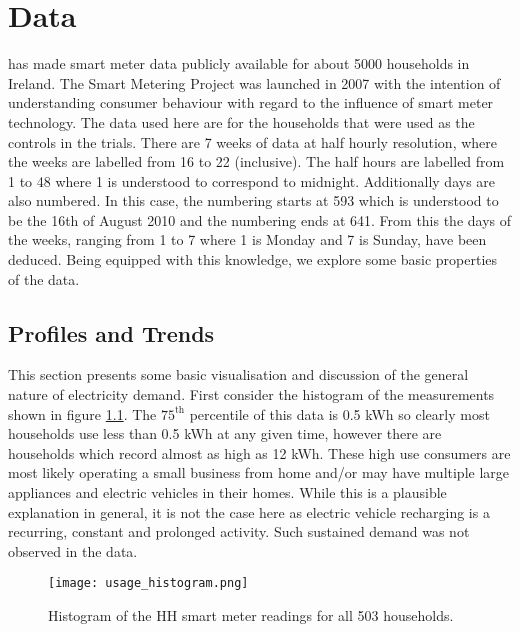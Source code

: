 
\chapter{Data} \label{sec:results}

\citet{issda} has made smart meter data publicly available for about 5000 households in Ireland. The Smart Metering Project was launched in 2007 with the intention of understanding consumer behaviour with regard to the influence of smart meter technology. The data used here are for the households that were used as the controls in the trials. There are 7 weeks of data at half hourly resolution, where the weeks are labelled from 16 to 22 (inclusive). The half hours are labelled from 1 to 48 where 1 is understood to correspond to midnight. Additionally days are also numbered. In this case, the numbering starts at 593 which is understood to be the 16th of August 2010 and the numbering ends at 641. From this the days of the weeks, ranging from 1 to 7 where 1 is Monday and 7 is Sunday, have been deduced. Being equipped with this knowledge, we explore some basic properties of the data.

\section{Profiles and Trends}
\label{subsec:basic} 
This section presents some basic visualisation and discussion of the general nature of electricity demand. First consider the histogram of the measurements shown in figure \ref{fig:hist}. The $75^{\text{th}}$ percentile of this data is 0.5 kWh so clearly most households use less than 0.5 kWh at any given time, however there are households which record almost as high as 12 kWh. These high use consumers are most likely operating a small business from home and/or may have multiple large appliances and electric vehicles in their homes.  While this is a plausible explanation in general, it is not the case here as electric vehicle recharging is a recurring, constant and prolonged activity. Such sustained demand was not observed in the data.

\begin{figure}
\centering
\texttt{[image: usage\_histogram.png]}
\caption{Histogram of the HH smart meter readings for all 503 households.}
\label{fig:hist} 
\end{figure}

